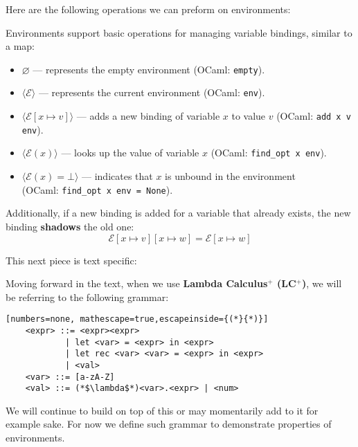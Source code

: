 \newpage
\noindent
Here are the following operations we can preform on environments:
\begin{Def}

   \label{def:env-operations}

   \noindent
   Environments support basic operations for managing variable bindings, similar to a map:

   \begin{itemize}
       \item \(\varnothing\) — represents the empty environment (OCaml: \texttt{empty}).
       \item $\langle\mathcal{E} \rangle$ — represents the current environment (OCaml: \texttt{env}).
       \item $\langle\mathcal{E}[x \mapsto v] \rangle$ — adds a new binding of variable \(x\) to value \(v\) (OCaml: \texttt{add x v env}).
       
       \item $\langle\mathcal{E}(x) \rangle$ — looks up the value of variable \(x\) (OCaml: \texttt{find\_opt x env}).
       
       \item $\langle\mathcal{E}(x) = \bot \rangle$ — indicates that \(x\) is unbound in the environment\\ (OCaml: \texttt{find\_opt x env = None}).
   \end{itemize}

   \noindent
   Additionally, if a new binding is added for a variable that already exists, the new binding \textbf{shadows} the old one:
   \[
   \mathcal{E}[x \mapsto v][x \mapsto w] = \mathcal{E}[x \mapsto w]
   \]
\end{Def}
\noindent
This next piece is text specific:
\begin{Def}

Moving forward in the text, when we use \textbf{Lambda Calculus$^+$ (LC$^+$)}, we will be referring to the following grammar:

\begin{lstlisting}[numbers=none, mathescape=true,escapeinside={(*}{*)}]
    <expr> ::= <expr><expr>
            | let <var> = <expr> in <expr>
            | let rec <var> <var> = <expr> in <expr>
            | <val>
    <var> ::= [a-zA-Z]
    <val> ::= (*$\lambda$*)<var>.<expr> | <num>
    \end{lstlisting}


\noindent
We will continue to build on top of this or may momentarily add to it for example sake. For 
now we define such grammar to demonstrate properties of environments.
\end{Def}        

